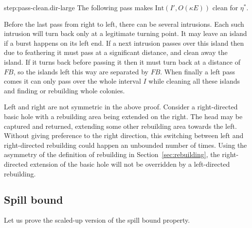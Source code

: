 \documentclass[11pt]{memoir}
\theoremstyle{definition} %
\def\B{B}
\newcommand{\E}{E}
\newcommand{\F}{F}
\newcommand{\Int}{\mathrm{Int}}
\begin{document}
\begin{Proof}
\begin{step+}{step:pass-clean.dir-large}
The following pass makes \( \Int(I',O(\kappa\E)) \) clean for \( \eta^{*} \).  
\end{step+}
\begin{pproof}
  Before the last pass from right to left, there can be several intrusions.
  Each such intrusion will turn back only at a legitimate turning point.
  It may leave an island if a burst happens on its left end.
  If a next intrusion passes over this island then due to feathering it must pass at a
  significant distance, and clean away the island.
  If it turns back before passing it then it must turn back at a distance of \( \F\B \),
  so the islands left this way are separated by \( \F\B \).
  When finally a left pass comes it can only pass over the whole interval \( I \) while
  cleaning all these islands and finding or rebuilding whole colonies.
\end{pproof} %

\end{Proof}

\begin{remark}
Left and right are not symmetric in the above proof.
Consider a right-directed basic hole with a rebuilding area being extended on the right.
The head may be captured and returned, extending some other rebuilding area towards the left.
Without giving preference to the right direction, this switching between left and right-directed rebuilding
could happen an unbounded number of times.
Using the asymmetry of the definition of rebuilding in Section~\ref{sec:rebuilding},
the right-directed extension of the basic hole will not be overridden by a left-directed rebuilding.  
\end{remark}

\subsection{Spill bound}\label{sec:spill-bound}

Let us prove the scaled-up version of the spill bound property.
\end{document}
